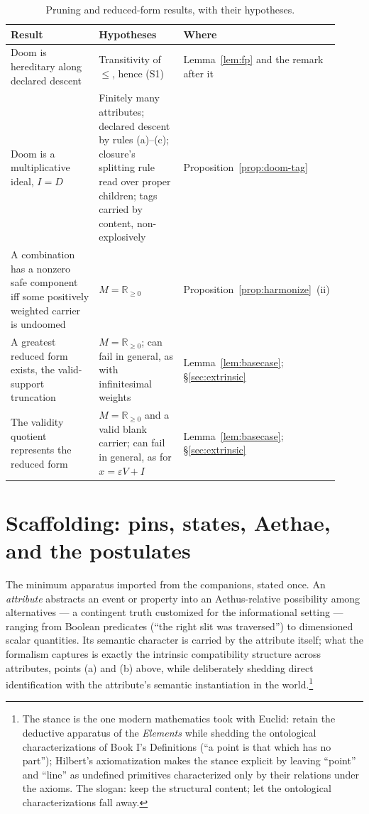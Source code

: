 \begin{table}[ht]
\centering
\small
\caption{Pruning and reduced-form results, with their hypotheses.}
\label{tab:pruning}
\begin{tabular}{@{}p{0.36\linewidth}p{0.34\linewidth}p{0.22\linewidth}@{}}
\toprule
Result & Hypotheses & Where \\
\midrule
Doom is hereditary along declared descent & Transitivity of $\le$, hence (S1) & Lemma~\ref{lem:fp} and the remark after it \\
Doom is a multiplicative ideal, $I = D$ & Finitely many attributes; declared descent by rules (a)--(c); closure's splitting rule read over proper children; tags carried by content, non-explosively & Proposition~\ref{prop:doom-tag} \\
A combination has a nonzero safe component iff some positively weighted carrier is undoomed & $M = \mathbb{R}_{\ge 0}$ & Proposition~\ref{prop:harmonize}~(ii) \\
A greatest reduced form exists, the valid-support truncation & $M = \mathbb{R}_{\ge 0}$; can fail in general, as with infinitesimal weights & Lemma~\ref{lem:basecase}; \S\ref{sec:extrinsic} \\
The validity quotient represents the reduced form & $M = \mathbb{R}_{\ge 0}$ and a valid blank carrier; can fail in general, as for $x = \varepsilon V + I$ & Lemma~\ref{lem:basecase}; \S\ref{sec:extrinsic} \\
\bottomrule
\end{tabular}
\end{table}

\section{Scaffolding: pins, states, Aethae, and the postulates}
\label{sec:scaffolding}

The minimum apparatus imported from the companions, stated once. An \emph{attribute} abstracts an event or property into an Aethus-relative possibility among alternatives --- a contingent truth customized for the informational setting --- ranging from Boolean predicates (``the right slit was traversed'') to dimensioned scalar quantities. Its semantic character is carried by the attribute itself; what the formalism captures is exactly the intrinsic compatibility structure across attributes, points (a) and (b) above, while deliberately shedding direct identification with the attribute's semantic instantiation in the world.\footnote{The stance is the one modern mathematics took with Euclid: retain the deductive apparatus of the \emph{Elements} while shedding the ontological characterizations of Book I's Definitions (``a point is that which has no part''); Hilbert's axiomatization makes the stance explicit by leaving ``point'' and ``line'' as undefined primitives characterized only by their relations under the axioms. The slogan: keep the structural content; let the ontological characterizations fall away.}

